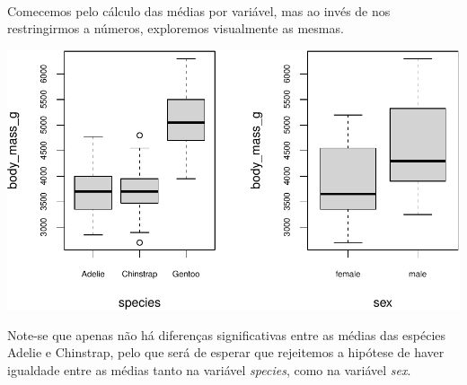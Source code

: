 \documentclass[]{article}
\begin{document}
\(\ \)

Comecemos pelo cálculo das médias por variável, mas ao invés de nos
restringirmos a números, exploremos visualmente as mesmas.

\begin{Shaded}
\begin{Highlighting}[]
\NormalTok{(} \NormalTok{(}\NormalTok{, }\NormalTok{))}

 \NormalTok{, } \NormalTok{, } \NormalTok{)}
 \NormalTok{, } \NormalTok{, } \NormalTok{)}
\end{Highlighting}
\end{Shaded}

\includegraphics{AEII_main_files/figure-latex/unnamed-chunk-14-1.pdf}

\begin{Shaded}
\begin{Highlighting}[]
\NormalTok{(} \NormalTok{(}\NormalTok{, }\NormalTok{))}
\end{Highlighting}
\end{Shaded}

Note-se que apenas não há diferenças significativas entre as médias das
espécies Adelie e Chinstrap, pelo que será de esperar que rejeitemos a
hipótese de haver igualdade entre as médias tanto na variável
\emph{species}, como na variável \emph{sex}.
\end{document}

